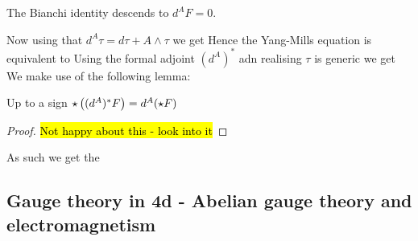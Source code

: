 \documentclass{article}
\begin{document}
\begin{corollary}
	The Bianchi identity descends to $d^A F = 0$. 
\end{corollary}

Now using that $d^A \tau  = d\tau + A \wedge \tau$ we get 
Hence the Yang-Mills equation is equivalent to 
Using the formal adjoint $(d^A)^\ast$ adn realising $\tau$ is generic we get 
We make use of the following lemma:
\begin{lemma} Up to a sign 
	$\star \left( (d^A)^\ast F \right) = d^A (\star F) $
\end{lemma}
\begin{proof}
\hl{Not happy about this - look into it}
\end{proof}
As such we get the 
\subsection{Gauge theory in 4d - Abelian gauge theory and electromagnetism}
\end{document}

